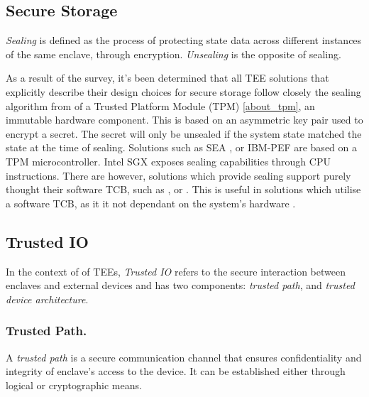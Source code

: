 \documentclass[runningheads,a4paper]{uwsese}
\begin{document}

\subsection{Secure Storage}

\emph{Sealing} is defined as the process of protecting state data across different 
instances of the same enclave, through encryption. \emph{Unsealing} is the opposite 
of sealing.

As a result of the survey, it's been determined that all TEE solutions that
explicitly describe their design choices for secure storage follow closely the
sealing algorithm from of a Trusted Platform Module (TPM) \cite{trust_plat_mod}
\ref{about_tpm}, an immutable hardware component. This is based on an
asymmetric key pair used to encrypt a secret. The secret will only be unsealed
if the system state matched the state at the time of sealing. Solutions such as
SEA \cite{sea_minimal_tcb}, or IBM-PEF \cite{ibm_pef} are based on a TPM
microcontroller. Intel SGX \cite{intel_sgx} exposes sealing capabilities
through CPU instructions. There are however, solutions which provide sealing
support purely thought their software TCB, such as \cite{optee}, or
\cite{tee_timber}. This is useful in solutions which utilise a software TCB, as
it it not dependant on the system's hardware \cite{tee_hw_sup}.

\subsection{Trusted IO}

In the context of of TEEs, \emph{Trusted IO} refers to the secure interaction
between enclaves and external devices and has two components: \emph{trusted path},
and \emph{trusted device architecture}.

\subsubsection{Trusted Path.}

A \emph{trusted path} is a secure communication channel that ensures
confidentiality and integrity of enclave's access to the device. It can be
established either through logical or cryptographic means.
\end{document}

